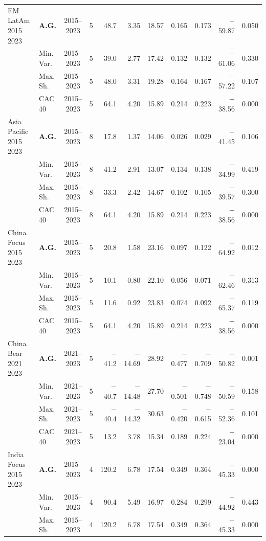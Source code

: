 \begin{longtable}{p{2.6cm} l c c r r r r r r r}
\midrule
EM LatAm 2015 2023 & \textbf{A.G.} & 2015--2023 & 5 & 48.7 & 3.35 & 18.57 & 0.165 & 0.173 & $-$59.87 & 0.050 \\
 & Min.\,Var. & 2015--2023 & 5 & 39.0 & 2.77 & 17.42 & 0.132 & 0.132 & $-$61.06 & 0.330 \\
 & Max.\,Sh. & 2015--2023 & 5 & 48.0 & 3.31 & 19.28 & 0.164 & 0.167 & $-$57.22 & 0.107 \\
 & CAC 40 & 2015--2023 & 5 & 64.1 & 4.20 & 15.89 & 0.214 & 0.223 & $-$38.56 & 0.000 \\
\midrule
Asia Pacific 2015 2023 & \textbf{A.G.} & 2015--2023 & 8 & 17.8 & 1.37 & 14.06 & 0.026 & 0.029 & $-$41.45 & 0.106 \\
 & Min.\,Var. & 2015--2023 & 8 & 41.2 & 2.91 & 13.07 & 0.134 & 0.138 & $-$34.99 & 0.419 \\
 & Max.\,Sh. & 2015--2023 & 8 & 33.3 & 2.42 & 14.67 & 0.102 & 0.105 & $-$39.57 & 0.300 \\
 & CAC 40 & 2015--2023 & 8 & 64.1 & 4.20 & 15.89 & 0.214 & 0.223 & $-$38.56 & 0.000 \\
\midrule
China Focus 2015 2023 & \textbf{A.G.} & 2015--2023 & 5 & 20.8 & 1.58 & 23.16 & 0.097 & 0.122 & $-$64.92 & 0.012 \\
 & Min.\,Var. & 2015--2023 & 5 & 10.1 & 0.80 & 22.10 & 0.056 & 0.071 & $-$62.46 & 0.313 \\
 & Max.\,Sh. & 2015--2023 & 5 & 11.6 & 0.92 & 23.83 & 0.074 & 0.092 & $-$65.37 & 0.119 \\
 & CAC 40 & 2015--2023 & 5 & 64.1 & 4.20 & 15.89 & 0.214 & 0.223 & $-$38.56 & 0.000 \\
\midrule
China Bear 2021 2023 & \textbf{A.G.} & 2021--2023 & 5 & $-$41.2 & $-$14.69 & 28.92 & $-$0.477 & $-$0.709 & $-$50.82 & 0.001 \\
 & Min.\,Var. & 2021--2023 & 5 & $-$40.7 & $-$14.48 & 27.70 & $-$0.501 & $-$0.748 & $-$50.59 & 0.158 \\
 & Max.\,Sh. & 2021--2023 & 5 & $-$40.4 & $-$14.32 & 30.63 & $-$0.420 & $-$0.615 & $-$52.36 & 0.101 \\
 & CAC 40 & 2021--2023 & 5 & 13.2 & 3.78 & 15.34 & 0.189 & 0.224 & $-$23.04 & 0.000 \\
\midrule
India Focus 2015 2023 & \textbf{A.G.} & 2015--2023 & 4 & 120.2 & 6.78 & 17.54 & 0.349 & 0.364 & $-$45.33 & 0.000 \\
 & Min.\,Var. & 2015--2023 & 4 & 90.4 & 5.49 & 16.97 & 0.284 & 0.299 & $-$44.92 & 0.443 \\
 & Max.\,Sh. & 2015--2023 & 4 & 120.2 & 6.78 & 17.54 & 0.349 & 0.364 & $-$45.33 & 0.000 \\

\end{longtable}
